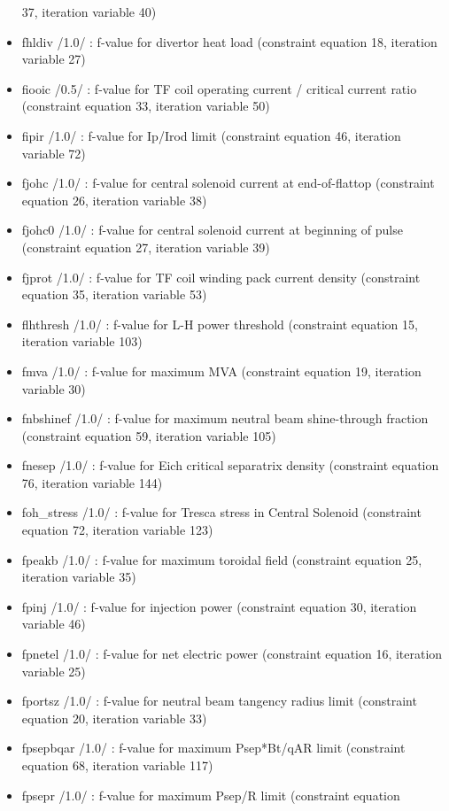 \documentclass[]{article}
\begin{document}
\begin{itemize}
  37, iteration variable 40)
\item
  fhldiv /1.0/ : f-value for divertor heat load (constraint equation 18,
  iteration variable 27)
\item
  fiooic /0.5/ : f-value for TF coil operating current / critical
  current ratio (constraint equation 33, iteration variable 50)
\item
  fipir /1.0/ : f-value for Ip/Irod limit (constraint equation 46,
  iteration variable 72)
\item
  fjohc /1.0/ : f-value for central solenoid current at end-of-flattop
  (constraint equation 26, iteration variable 38)
\item
  fjohc0 /1.0/ : f-value for central solenoid current at beginning of
  pulse (constraint equation 27, iteration variable 39)
\item
  fjprot /1.0/ : f-value for TF coil winding pack current density
  (constraint equation 35, iteration variable 53)
\item
  flhthresh /1.0/ : f-value for L-H power threshold (constraint equation
  15, iteration variable 103)
\item
  fmva /1.0/ : f-value for maximum MVA (constraint equation 19,
  iteration variable 30)
\item
  fnbshinef /1.0/ : f-value for maximum neutral beam shine-through
  fraction (constraint equation 59, iteration variable 105)
\item
  fnesep /1.0/ : f-value for Eich critical separatrix density
  (constraint equation 76, iteration variable 144)
\item
  foh\_stress /1.0/ : f-value for Tresca stress in Central Solenoid
  (constraint equation 72, iteration variable 123)
\item
  fpeakb /1.0/ : f-value for maximum toroidal field (constraint equation
  25, iteration variable 35)
\item
  fpinj /1.0/ : f-value for injection power (constraint equation 30,
  iteration variable 46)
\item
  fpnetel /1.0/ : f-value for net electric power (constraint equation
  16, iteration variable 25)
\item
  fportsz /1.0/ : f-value for neutral beam tangency radius limit
  (constraint equation 20, iteration variable 33)
\item
  fpsepbqar /1.0/ : f-value for maximum Psep*Bt/qAR limit (constraint
  equation 68, iteration variable 117)
\item
  fpsepr /1.0/ : f-value for maximum Psep/R limit (constraint equation

\end{itemize}
\end{document}
